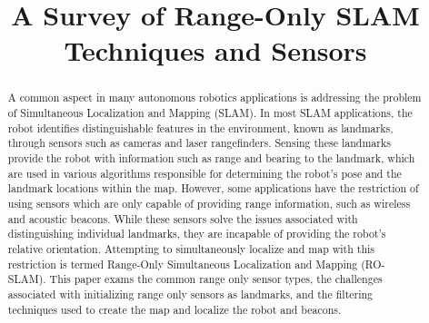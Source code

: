 \documentclass[conference]{IEEEtran}
\begin{document}
	\title{A Survey of Range-Only SLAM Techniques and Sensors}
	
	\author{
	}
	
	
	
	
	
	
	
	
	
	
	\maketitle
	
	
	
	
	\begin{abstract}		
		A common aspect in many autonomous robotics applications is addressing the problem of Simultaneous Localization and Mapping (SLAM). In most SLAM applications, the robot identifies distinguishable features in the environment, known as landmarks, through sensors such as cameras and laser rangefinders. Sensing these landmarks provide the robot with information such as range and bearing to the landmark, which are used in various algorithms responsible for determining the robot's pose and the landmark locations within the map. However, some applications have the restriction of using sensors which are only capable of providing range information, such as wireless and acoustic beacons. While these sensors solve the issues associated with distinguishing individual landmarks, they are incapable of providing the robot's relative orientation. Attempting to simultaneously localize and map with this restriction is termed Range-Only Simultaneous Localization and Mapping (RO-SLAM). This paper exams the common range only sensor types, the challenges associated with initializing range only sensors as landmarks, and the filtering techniques used to create the map and localize the robot and beacons.
		
		
	\end{abstract}
	
\end{document}
